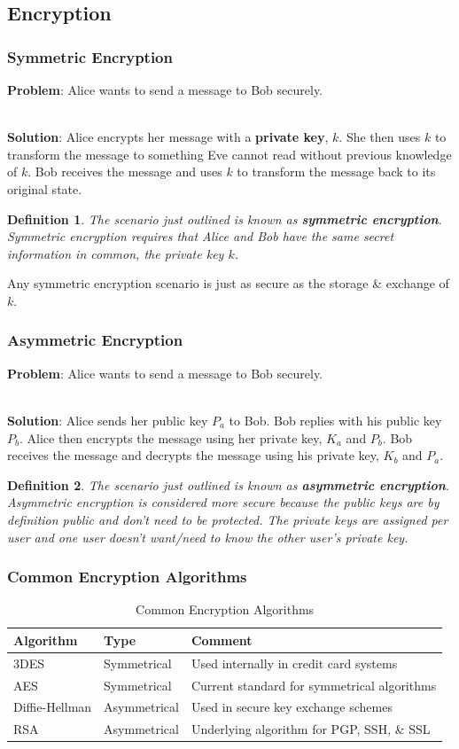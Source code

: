\documentclass[aspectratio=169]{beamer}
\newtheorem{defn}{Definition}
\begin{document}
\subsection{Encryption}
\begin{frame}
\frametitle{Symmetric Encryption}
\textbf{Problem}: Alice wants to send a message to Bob securely.

\mbox{}\\
\textbf{Solution}: Alice encrypts her message with a \textbf{private key}, $k$. She then uses $k$ to transform the message to something Eve cannot read without previous knowledge of $k$. Bob receives the message and uses $k$ to transform the message back to its original state.

\begin{defn}
The scenario just outlined is known as \textbf{symmetric encryption}. Symmetric encryption requires that Alice and Bob have the same secret information in common, the private key $k$.
\end{defn}
Any symmetric encryption scenario is just as secure as the storage \& exchange of $k$.
\end{frame}

\begin{frame}
\frametitle{Asymmetric Encryption}
\textbf{Problem}: Alice wants to send a message to Bob securely.

\mbox{}\\
\textbf{Solution}: Alice sends her public key $P_a$ to Bob. Bob replies with his public key $P_b$. Alice then encrypts the message using her private key, $K_a$ and $P_b$. Bob receives the message and decrypts the message using his private key, $K_b$ and $P_a$.

\begin{defn}
The scenario just outlined is known as \textbf{asymmetric encryption}. Asymmetric encryption is considered more secure because the public keys are by definition public and don't need to be protected. The private keys are assigned per user and one user doesn't want/need to know the other user's private key.
\end{defn}
\end{frame}

\begin{frame}
\frametitle{Common Encryption Algorithms}
\begin{table}
\begin{tabular}{|l|l|p{4cm}|}
\hline
\textbf{Algorithm} & \textbf{Type} & \textbf{Comment}\\
\hline
3DES & Symmetrical & Used internally in credit card systems\\
\hline
AES & Symmetrical & Current standard for symmetrical algorithms\\
\hline
Diffie-Hellman & Asymmetrical & Used in secure key exchange schemes\\
\hline
RSA & Asymmetrical & Underlying algorithm for PGP, SSH, \& SSL\\
\hline
\end{tabular}
\caption{Common Encryption Algorithms}
\label{tbl:algorithms}
\end{table}
\end{frame}
\end{document}
